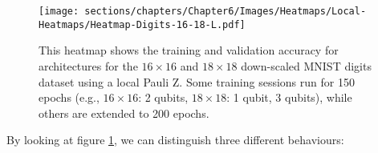 \begin{figure}[h]
    \centering
    \texttt{[image: sections/chapters/Chapter6/Images/Heatmaps/Local-Heatmaps/Heatmap-Digits-16-18-L.pdf]}
    \caption{This heatmap shows the training and validation accuracy for architectures for the $16\times16$ and $18\times18$ down-scaled MNIST digits
     dataset using a local Pauli Z.
     Some training sessions run for 150 epochs (e.g., $16 \times 16$: 2 qubits, $18 \times 18$: 
     1 qubit, 3 qubits), while others are extended to 200 epochs.}
    \label{fig:heatmap-14x14-L}
\end{figure}

By looking at figure \ref{fig:heatmap-14x14-L}, we can distinguish 
three different behaviours: